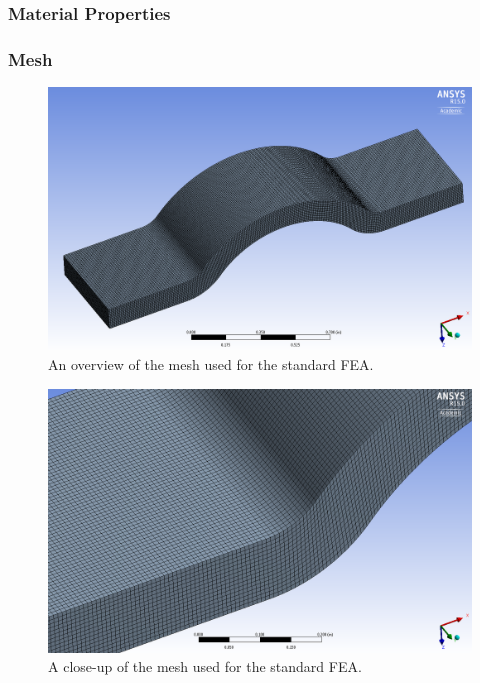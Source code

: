 \clearpage

\subsubsection{Material Properties}

\clearpage

\subsubsection{Mesh}

\begin{figure}[htp]
\centering
\includegraphics[width=1\textwidth]{./figures/fea/fea-solid-mesh-overview}
\caption{An overview of the mesh used for the standard FEA.}
\label{fig:fea-solid-mesh-overview}
\end{figure}

\begin{figure}[htp]
\centering
\includegraphics[width=1\textwidth]{./figures/fea/fea-solid-mesh-closeup}
\caption{A close-up of the mesh used for the standard FEA.}
\label{fig:fea-solid-mesh-closeup}
\end{figure}

